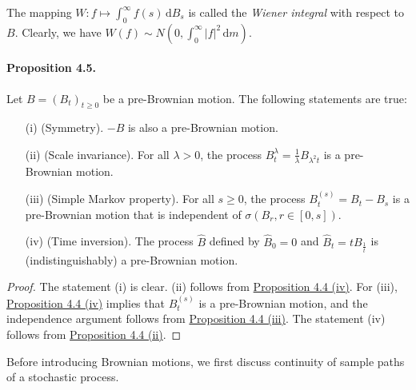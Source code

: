 \documentclass{article}
\numberwithin{equation}{section}
\renewcommand{\d}{\mathrm{d}}
\theoremstyle{plain}
\theoremstyle{definition}
\begin{document}
The mapping $W:f\mapsto \int_0^\infty f(s)\,\d B_s$ is called the \textit{Wiener integral} with respect to $B$. Clearly, we have $W(f)\sim N\left(0,\int_0^\infty\vert f\vert^2\,\d m\right)$.

\paragraph{Proposition 4.5.\label{prop:4.5}} Let $B=(B_t)_{t\geq 0}$ be a pre-Brownian motion. The following statements are true:
\begin{itemize}
	\item[(i)] (Symmetry). $-B$ is also a pre-Brownian motion.
	\item[(ii)] (Scale invariance). For all $\lambda>0$, the process $B_t^\lambda=\frac{1}{\lambda}B_{\lambda^2t}$ is a pre-Brownian motion.
	\item[(iii)] (Simple Markov property). For all $s\geq 0$, the process $B_t^{(s)}=B_t-B_s$ is a pre-Brownian motion that is independent of $\sigma(B_r,r\in[0,s])$.
	\item[(iv)] (Time inversion). The process $\widehat{B}$ defined by $\widehat{B}_0=0$ and $\widehat{B}_t=tB_{\frac{1}{t}}$ is (indistinguishably) a pre-Brownian motion.
\end{itemize}
\begin{proof}
The statement (i) is clear. (ii) follows from \hyperref[prop:4.4]{Proposition 4.4 (iv)}. For (iii), \hyperref[prop:4.4]{Proposition 4.4 (iv)} implies that $B_t^{(s)}$ is a pre-Brownian motion, and the independence argument follows from \hyperref[prop:4.4]{Proposition 4.4 (iii)}. The statement (iv) follows from \hyperref[prop:4.4]{Proposition 4.4 (ii)}.
\end{proof}

Before introducing Brownian motions, we first discuss continuity of sample paths of a stochastic process.
\end{document}
